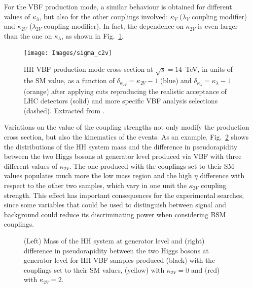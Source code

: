 \documentclass[../main.tex]{subfiles}
\begin{document}
For the VBF production mode, a similar behaviour is obtained for different values of $\kappa_\lambda$, but also for the other couplings involved: $\kappa_V$ ($\lambda_V$ coupling modifier) and $\kappa_{2V}$ ($\lambda_{2V}$ coupling modifier). In fact, the dependence on $\kappa_{2V}$ is even larger than the one on $\kappa_\lambda$, as shown in Fig.~\ref{theo:fig:vbf_k2v_kl}.


\begin{figure}[h!]
\begin{center}
\texttt{[image: Images/sigma\_c2v]}
\end{center}
\caption[HH VBF production mode cross section]{HH VBF production mode cross section at $\sqrt{s}=14$~TeV, in units of the SM value, as a function of $\delta_{\kappa_{2V}} = \kappa_{2V} - 1$ (blue) and $\delta_{\kappa_\lambda} = \kappa_\lambda - 1$ (orange) after applying cuts reproducing the realistic acceptance of LHC detectors (solid) and more specific VBF analysis selections (dashed). Extracted from \cite{intro:theo:c2v}.}
\label{theo:fig:vbf_k2v_kl}
\end{figure}

Variations on the value of the coupling strengths not only modify the production cross section, but also the kinematics of the events. As an example, Fig.~\ref{theo:fig:genhh_mass} shows the distributions of the HH system mass and the difference in pseudorapidity between the two Higgs bosons at generator level produced via VBF with three different values of $\kappa_{2V}$. The one produced with the couplings set to their SM values populates much more the low mass region and the high $\eta$ difference with respect to the other two samples, which vary in one unit the $\kappa_{2V}$ coupling strength. This effect has important consequences for the experimental searches, since some variables that could be used to distinguish between signal and background could reduce its discriminating power when considering BSM couplings.

\begin{figure}[h!]
\begin{center}
\end{center}
\caption[HH system mass and difference in pseudorapidity]{(Left) Mass of the HH system at generator level and (right) difference in pseudorapidity between the two Higgs bosons at generator level for HH VBF samples produced (black) with the couplings set to their SM values, (yellow) with $\kappa_{2V} = 0$ and (red) with $\kappa_{2V} = 2$. }
\label{theo:fig:genhh_mass}
\end{figure}
\end{document}
